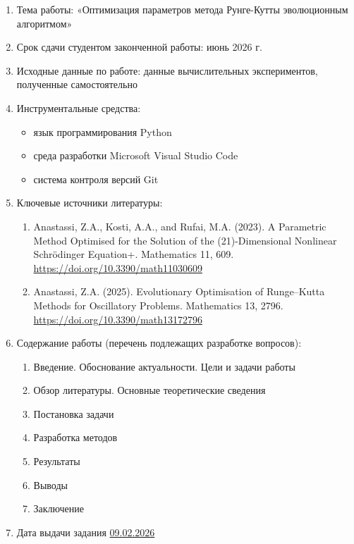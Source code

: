 \begin{enumerate}
	\item Тема работы: «Оптимизация параметров метода Рунге-Кутты эволюционным алгоритмом»
	\item Срок сдачи студентом законченной работы: июнь 2026 г.
	\item Исходные данные по работе: данные вычислительных экспериментов, полученные самостоятельно
	\item Инструментальные средства:
		\begin{itemize}
			\item язык программирования Python
			\item среда разработки Microsoft Visual Studio Code
			\item система контроля версий Git
		\end{itemize}
	\item Ключевые источники литературы:
		\begin{enumerate}
			\item Anastassi, Z.A., Kosti, A.A., and Rufai, M.A. (2023). A Parametric Method Optimised for the Solution of the (21)-Dimensional Nonlinear Schrödinger Equation+. Mathematics 11, 609. \href{https://doi.org/10.3390/math11030609}{https://doi.org/10.3390/math11030609}
			
			\item Anastassi, Z.A. (2025). Evolutionary Optimisation of Runge–Kutta Methods for Oscillatory Problems. Mathematics 13, 2796. \\ \href{https://doi.org/10.3390/math13172796}{https://doi.org/10.3390/math13172796}
		\end{enumerate}
		
		\item Содержание работы (перечень подлежащих разработке вопросов):
		\begin{enumerate}
			\item Введение. Обоснование актуальности. Цели и задачи работы
			\item Обзор литературы. Основные теоретические сведения
			\item Постановка задачи
			\item Разработка методов
			\item Результаты
			\item Выводы
			\item Заключение
		\end{enumerate}
		
		\item Дата выдачи задания \underline{09.02.2026} \hfill
\end{enumerate}

